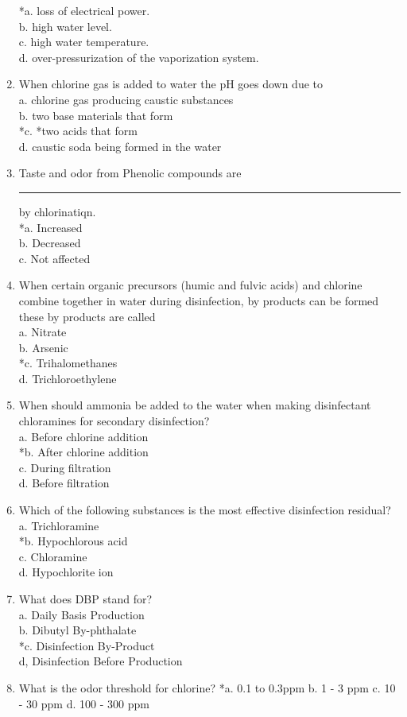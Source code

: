 \begin{enumerate}[1.]
*a. loss of electrical power.\\
b. high water level.\\
c. high water temperature.\\
d. over-pressurization of the vaporization system.
\item When chlorine gas is added to water the $\mathrm{pH}$ goes down due to\\
a. chlorine gas producing caustic substances\\
b. two base materials that form\\
*c. *two acids that form\\
d. caustic soda being formed in the water
\item Taste and odor from Phenolic compounds are \rule{1.5cm}{0.5pt} by chlorinatiqn.\\
*a. Increased\\
b. Decreased\\
c. Not affected\\
\item When certain organic precursors (humic and fulvic acids) and chlorine combine together in water during disinfection, by products can be formed these by products are called\\
a.	Nitrate\\
b.	Arsenic\\
*c.	Trihalomethanes\\
d.	Trichloroethylene\\
\item When should ammonia be added to the water when making disinfectant chloramines for secondary disinfection?\\
a.	Before chlorine addition\\
*b.	After chlorine addition\\
c.	During filtration\\
d.	Before filtration\\
\item Which of the following substances is the most effective disinfection residual?\\
a.	Trichloramine\\
*b.	Hypochlorous acid\\
c.	Chloramine\\
d.	Hypochlorite  ion

\item What does DBP stand for?\\
a. Daily Basis Production\\
b. Dibutyl By-phthalate\\
*c. Disinfection By-Product\\
d, Disinfection Before Production\\

\item What is the odor threshold for chlorine?
*a.  0.1 to 0.3ppm
b. 1 - 3 ppm
c. 10 - 30 ppm
d. 100 - 300 ppm
\end{enumerate}
\newpage


